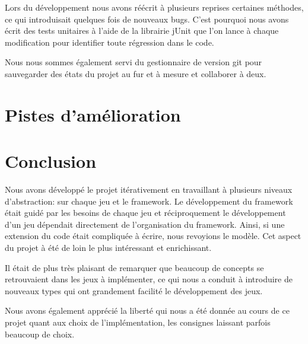 \documentclass[a4paper, 11pt, DIV=9]{scrartcl}
\begin{document}
Lors du développement nous avons réécrit à plusieurs reprises certaines
méthodes, ce qui introduisait quelques fois de nouveaux bugs. C'est pourquoi
nous avons écrit des tests unitaires à l'aide de la librairie jUnit que l'on lance à
chaque modification pour identifier toute régression dans le code.

Nous nous sommes également servi du gestionnaire de version git pour sauvegarder
des états du projet au fur et à mesure et collaborer à deux.

\section{Pistes d'amélioration}


\section{Conclusion}

Nous avons développé le projet itérativement en travaillant à plusieurs niveaux
d'abstraction: sur chaque jeu et le framework. Le développement du framework
était guidé par les besoins de chaque jeu et réciproquement le développement
d'un jeu dépendait directement de l'organisation du framework. Ainsi, si une
extension du code était compliquée à écrire, nous revoyions le modèle. 
Cet aspect du projet à été de loin le plus intéressant et enrichissant.

Il était de plus très plaisant de remarquer que beaucoup de concepts se
retrouvaient dans les jeux à implémenter, ce qui nous a conduit à introduire de
nouveaux types qui ont grandement facilité le développement des jeux.

Nous avons également apprécié la liberté qui nous a été donnée au cours de ce projet
quant aux choix de l'implémentation, les consignes laissant parfois beaucoup de choix.
\end{document}
